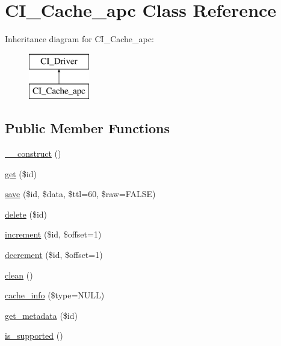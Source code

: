 \hypertarget{class_c_i___cache__apc}{}\section{C\+I\+\_\+\+Cache\+\_\+apc Class Reference}
\label{class_c_i___cache__apc}
Inheritance diagram for C\+I\+\_\+\+Cache\+\_\+apc\+:\begin{figure}[H]
\begin{center}
\leavevmode
\includegraphics[height=2.000000cm]{class_c_i___cache__apc}
\end{center}
\end{figure}
\subsection*{Public Member Functions}
\begin{DoxyCompactItemize}
\item 
\mbox{\hyperlink{class_c_i___cache__apc_a8d8afe54c92276e034958951f77156a4}{\+\_\+\+\_\+construct}} ()
\item 
\mbox{\hyperlink{class_c_i___cache__apc_aa87b38f038c3b500f0902b7aade4e104}{get}} (\$id)
\item 
\mbox{\hyperlink{class_c_i___cache__apc_ab840c2a2e2808cfeff8a827ba63b14df}{save}} (\$id, \$data, \$ttl=60, \$raw=F\+A\+L\+SE)
\item 
\mbox{\hyperlink{class_c_i___cache__apc_a853a24624b78ad67299a0c606e24e9fc}{delete}} (\$id)
\item 
\mbox{\hyperlink{class_c_i___cache__apc_a8d8318d7f0d25407a88287db467e9277}{increment}} (\$id, \$offset=1)
\item 
\mbox{\hyperlink{class_c_i___cache__apc_a81da74209e6709bdc1670610cc6a2832}{decrement}} (\$id, \$offset=1)
\item 
\mbox{\hyperlink{class_c_i___cache__apc_ae3b144e2747962fbb05f80874bbc3f2c}{clean}} ()
\item 
\mbox{\hyperlink{class_c_i___cache__apc_a55afd4a170374e9324032a679a591a27}{cache\+\_\+info}} (\$type=N\+U\+LL)
\item 
\mbox{\hyperlink{class_c_i___cache__apc_a84dd11b9fc0bdebedadc36679eef5976}{get\+\_\+metadata}} (\$id)
\item 
\mbox{\hyperlink{class_c_i___cache__apc_a692b0b2aa0ce575fb04e0acce68bd988}{is\+\_\+supported}} ()
\end{DoxyCompactItemize}
